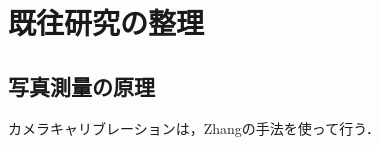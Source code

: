 \section{既往研究の整理}\label{sec:review}
\subsection{写真測量の原理}\label{subsec:photo}
カメラキャリブレーションは，Zhangの手法\cite{zhang2000flexible}を使って行う．
